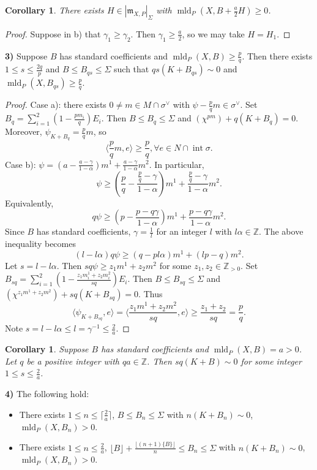 \documentclass[12pt,reqno]{amsart}
\newcommand{\Z}{{\mathbb Z}}
\newcommand{\fm}{{\mathfrak m}} %
\newcommand{\Int}{\operatorname{int}}
\newcommand{\mld}{\operatorname{mld}}
\theoremstyle{plain}
\newtheorem{cor}[thm]{Corollary}
\theoremstyle{definition}
\theoremstyle{remark}
\begin{document}
\begin{cor}
There exists $H\in |\fm_{X,P}|_\Sigma$ with $\mld_P(X,B+\frac{a}{2}H)\ge 0$.
\end{cor}

\begin{proof}
Suppose in b) that $\gamma_1\ge \gamma_2$. Then $\gamma_1\ge \frac{a}{2}$,
so we may take $H=H_1$.
\end{proof}

{\bf 3)} Suppose $B$ has standard coefficients and 
$\mld_P(X,B)\ge \frac{p}{q}$. Then there exists $1\le s\le \frac{2q}{p}$
and $B\le B_{qs}\le \Sigma$ such that $qs(K+B_{qs})\sim 0$ and 
$\mld_P(X,B_{qs})\ge \frac{p}{q}$.

\begin{proof} Case a): there exists $0\ne m\in M\cap \sigma^\vee$
with $\psi-\frac{p}{q}m\in \sigma^\vee$. Set 
$B_q=\sum_{i=1}^2(1-\frac{pm_i}{q})E_i$. Then $B\le B_q\le \Sigma$
and $(\chi^{pm})+q(K+B_q)=0$. Moreover, $\psi_{K+B_q}=\frac{p}{q}m$, so
$$
\langle \frac{p}{q}m,e\rangle\ge \frac{p}{q},\forall e\in N\cap \Int\sigma.
$$
Case b): $\psi=(a-\frac{a-\gamma}{1-\alpha})m^1+\frac{a-\gamma}{1-\alpha}m^2$.
In particular, 
$$
\psi\ge (\frac{p}{q}-\frac{\frac{p}{q}-\gamma}{1-\alpha})m^1+
\frac{\frac{p}{q}-\gamma}{1-\alpha}m^2.
$$
Equivalently,
$$
q\psi\ge (p-\frac{p-q\gamma}{1-\alpha})m^1+\frac{p-q\gamma}{1-\alpha}m^2.
$$
Since $B$ has standard coefficients, $\gamma=\frac{1}{l}$ for an
integer $l$ with $l\alpha\in \Z$. The above inequality becomes 
$$
(l-l\alpha) q\psi\ge (q-pl\alpha)m^1+(lp-q)m^2.
$$
Let $s=l-l\alpha$. Then $sq\psi\ge z_1m^1+z_2m^2$ for some
$z_1,z_2\in \Z_{>0}$. Set $B_{sq}=\sum_{i=1}^2(1-\frac{z_1m^1_i+z_2m^2_i}{sq})E_i$.
Then $B\le B_{sq}\le \Sigma$ and $(\chi^{z_1m^1+z_2m^2})+sq(K+B_{sq})=0$.
Thus 
$$
\langle \psi_{K+B_{sq}},e\rangle=
\langle \frac{z_1m^1+z_2m^2}{sq},e\rangle\ge \frac{z_1+z_2}{sq}=\frac{p}{q}.
$$
Note $s=l-l\alpha\le l=\gamma^{-1}\le \frac{2}{a}$.
\end{proof}

\begin{cor}
Suppose $B$ has standard coefficients and $\mld_P(X,B)=a>0$. 
Let $q$ be a positive integer with $qa\in \Z$. Then $sq(K+B)\sim 0$
for some integer $1\le s\le \frac{2}{a}$.
\end{cor}

{\bf 4)} The following hold:
\begin{itemize}
\item There exists $1\le n\le \lceil \frac{2}{a}\rceil$,
$B\le B_n\le \Sigma$ with $n(K+B_n)\sim 0$, $\mld_P(X,B_n)>0$.
\item There exists $1\le n\le \frac{2}{a}$,
$\lfloor B\rfloor+\frac{\lfloor (n+1)\{B\}\rfloor}{n}\le 
B_n\le \Sigma$ with $n(K+B_n)\sim 0$, $\mld_P(X,B_n)>0$.
\end{itemize}
\end{document}
